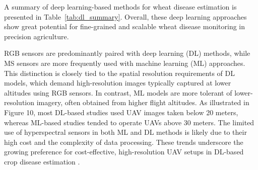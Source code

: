 A summary of deep learning-based methods for wheat disease estimation is presented in Table~\ref{tab:dl_summary}. Overall, these deep learning approaches show great potential for fine-grained and scalable wheat disease monitoring in precision agriculture.
\begin{table}[htbp]
    \caption{Summary of deep learning-based methods for wheat disease estimation.}
    \centering
    \label{tab:dl_summary}
\end{table}

    









RGB sensors are predominantly paired with deep learning (DL) methods, while MS sensors are more frequently used with machine learning (ML) approaches. This distinction is closely tied to the spatial resolution requirements of DL models, which demand high-resolution images typically captured at lower altitudes using RGB sensors. In contrast, ML models are more tolerant of lower-resolution imagery, often obtained from higher flight altitudes. As illustrated in Figure 10, most DL-based studies used UAV images taken below 20 meters, whereas ML-based studies tended to operate UAVs above 30 meters. The limited use of hyperspectral sensors in both ML and DL methods is likely due to their high cost and the complexity of data processing. These trends underscore the growing preference for cost-effective, high-resolution UAV setups in DL-based crop disease estimation \parencite{shahi2023recent}.


